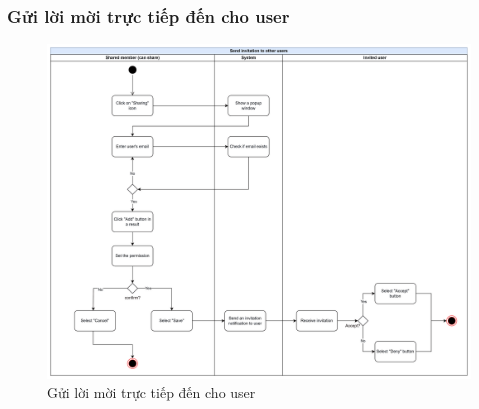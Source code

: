 \subsubsection{Gửi lời mời trực tiếp đến cho user}
    \begin{figure}[H]
        \centering
        \includegraphics[width=\linewidth]{Content/Phân tích và thiết kế hệ thống/documents/Sơ đồ hoạt động/images/sendInvitation.png}
        \vspace{0.5cm}
        \caption{Gửi lời mời trực tiếp đến cho user}
        \label{fig:Gửi lời mời trực tiếp đến cho user}
    \end{figure}
